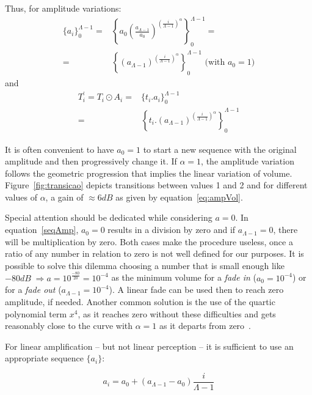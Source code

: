 Thus, for amplitude variations:
\begin{equation}\label{seqAmp}
\begin{split}
 \{a_i\}_0^{\Lambda-1}= & \left \{ a_0 \left ( \frac{a_{\Lambda-1}}{a_0} \right )^{\left ( \frac{i}{\Lambda-1} \right )^\alpha} \right \}_0^{\Lambda-1}= \\ = & \left \{ \left ( {a_{\Lambda-1}} \right )^{\left ( \frac{i}{\Lambda-1} \right )^\alpha} \right \}_0^{\Lambda-1} \text{ (with } a_0=1 \text{)}
\end{split}
\end{equation}
and
\begin{equation}\label{transAmp}
\begin{split}
 T_i^{'}=T_i \odot A_i = & \{t_i . a_i\}_0^{\Lambda-1} \\ = & \left \{ t_i . (a_{\Lambda-1} )^{\left ( \frac{i}{\Lambda-1} \right )^\alpha} \right \}_0^{\Lambda-1}
\end{split}
\end{equation}

It is often convenient to have $a_0=1$ to start a new sequence with the original amplitude and then progressively change it.
If $\alpha=1$, the amplitude variation follows the geometric progression that implies the linear variation of volume. Figure~\ref{fig:transicao} depicts transitions between values 1 and 2 and for different values of $\alpha$, a gain of $\approx 6dB$ as given by equation~\ref{eq:ampVol}.

Special attention should be dedicated while considering $a=0$.
In equation~\ref{seqAmp}, $a_0=0$ results in a division by zero and if $a_{\Lambda-1}=0$, there will be multiplication by zero. Both cases make the procedure useless, once a ratio of any number in relation to zero is not well defined for our purposes. It is possible to solve this dilemma choosing a number that is small enough like $-80dB\;\Rightarrow a=10^{\frac{-80}{20}}=10^{-4}$ as the minimum volume for a \emph{fade in} ($a_0=10^{-4}$) or for a \emph{fade out} ($a_{\Lambda-1}=10^{-4}$). A linear fade can be used then to reach zero amplitude, if needed. Another common solution is the use of the quartic polynomial term $x^4$, as it reaches zero without these difficulties and gets reasonably close to the curve with $\alpha=1$ as it departs from zero~\cite{Cook}.

For linear amplification -- but not linear perception -- it is sufficient to use an appropriate sequence $\{a_i\}$:

\begin{equation}\label{seqAmpLin}
a_i=a_0 + (a_{\Lambda-1}-a_0)\frac{i}{\Lambda-1}
\end{equation}


